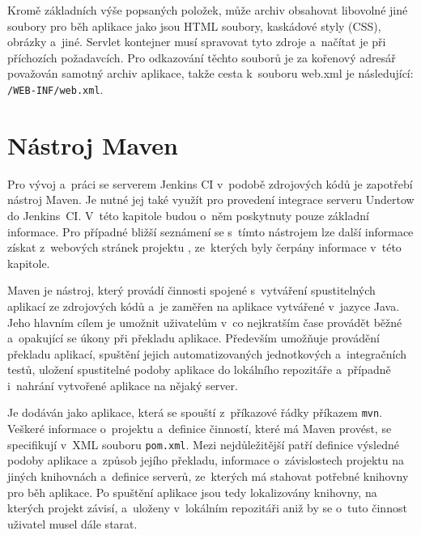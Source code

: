             Kromě základních výše popsaných položek, může archiv obsahovat libovolné jiné soubory pro běh aplikace jako jsou 
            HTML soubory, kaskádové styly (CSS), obrázky a~jiné. Servlet kontejner musí spravovat tyto zdroje
            a~načítat je při příchozích požadavcích. Pro odkazování těchto souborů je za kořenový adresář považován
            samotný archiv aplikace, takže cesta k~souboru web.xml je následující: \texttt{/WEB-INF/web.xml}.

            
         
    \section{Nástroj Maven} \label{maven}
        Pro vývoj a~práci se serverem Jenkins CI v~podobě zdrojových kódů je zapotřebí nástroj Maven. 
        Je nutné jej také využít pro provedení integrace serveru Undertow do Jenkins~CI. 
        V~této kapitole budou o~něm poskytnuty pouze základní informace. Pro případné bližší
        seznámení se s~tímto nástrojem lze další informace získat z~webových stránek projektu \cite{mavenWeb},
        ze~kterých byly čerpány informace v~této kapitole. 
        
        Maven je nástroj, který provádí činnosti spojené s~vytváření spustitelných aplikací ze zdrojových kódů
        a~je zaměřen na aplikace vytvářené v~jazyce Java. Jeho hlavním cílem je umožnit uživatelům v~co nejkratším
        čase provádět běžné a~opakující se úkony při překladu aplikace. Především umožňuje
        provádění překladu aplikací, spuštění jejich automatizovaných jednotkových
        a~integračních testů, uložení spustitelné podoby aplikace do lokálního repozitáře 
        a~případně i~nahrání vytvořené aplikace na nějaký server. 

        Je dodáván jako aplikace, která se spouští z~příkazové řádky příkazem \texttt{mvn}. Veškeré
        informace o~projektu a~definice činností, které má Maven provést, se specifikují
        v~XML souboru \texttt{pom.xml}. Mezi nejdůležitější patří definice výsledné podoby aplikace
        a~způsob jejího překladu, informace o~závislostech
        projektu na jiných knihovnách a~definice serverů, ze~kterých má stahovat potřebné knihovny pro běh aplikace. 
        Po spuštění aplikace jsou tedy lokalizovány knihovny, na kterých projekt
        závisí, a~uloženy v~lokálním repozitáři aniž by se o~tuto činnost uživatel musel dále starat.

